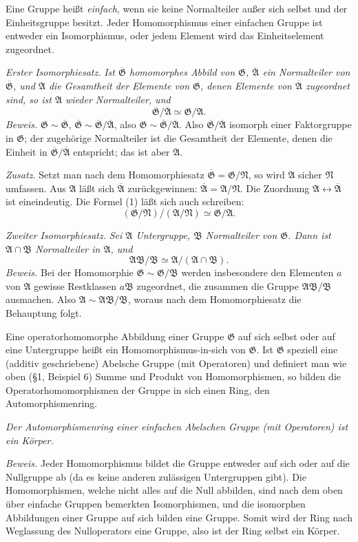 \documentclass[11pt]{article}
\providecommand{\mG}{\mathfrak{G}}
\providecommand{\mA}{\mathfrak{A}}
\providecommand{\mB}{\mathfrak{B}}
\providecommand{\mN}{\mathfrak{N}}
\begin{document}
Eine Gruppe heißt \emph{einfach}, wenn sie keine Normalteiler außer sich selbst und der Einheitsgruppe besitzt. Jeder Homomorphismus einer einfachen Gruppe ist entweder ein Isomorphismus, oder jedem Element wird das Einheitselement zugeordnet.

\emph{Erster Isomorphiesatz.} \emph{Ist $\overline{\mG}$ homomorphes Abbild von $\mG$, $\overline{\mA}$ ein Normalteiler von $\overline{\mG}$, und $\mA$ die Gesamtheit der Elemente von $\mG$, denen Elemente von $\overline{\mA}$ zugeordnet sind, so ist $\mA$ wieder Normalteiler, und}
\[
        \overline{\mG}/\overline{\mA}\simeq \mG/\mA. \tag{1}
\]
\emph{Beweis.} $\mG\sim\overline{\mG}$, $\overline{\mG}\sim\overline{\mG}/\overline{\mA}$, also $\mG\sim\overline{\mG}/\overline{\mA}$. Also $\overline{\mG}/\overline{\mA}$ isomorph einer Faktorgruppe in $\mG$; der zugehörige Normalteiler ist die Gesamtheit der Elemente, denen die Einheit in $\overline{\mG}/\overline{\mA}$ entspricht; das ist aber $\mA$.

\emph{Zusatz.} Setzt man nach dem Homomorphiesatz $\overline{\mG}=\mG/\mN$, so wird $\mA$ sicher $\mN$ umfassen. Aus $\mA$ läßt sich $\overline{\mA}$ zurückgewinnen: $\overline{\mA}=\mA/\mN$. Die Zuordnung $\mA\leftrightarrow\overline{\mA}$ ist eineindeutig. Die Formel (1) läßt sich auch schreiben:
\[
        (\mG/\mN)/(\mA/\mN)\simeq \mG/\mA.
\]

\emph{Zweiter Isomorphiesatz.} \emph{Sei $\mA$ Untergruppe, $\mB$ Normalteiler von $\mG$. Dann ist $\mA\cap\mB$ Normalteiler in $\mA$, und}
\[
        \mA\mB/\mB\simeq \mA/(\mA\cap\mB).
\]
\emph{Beweis.} Bei der Homomorphie $\mG\sim\mG/\mB$ werden insbesondere den Elementen $a$ von $\mA$ gewisse Restklassen $a\mB$ zugeordnet, die zusammen die Gruppe $\mA\mB/\mB$ ausmachen. Also $\mA\sim\mA\mB/\mB$, woraus nach dem Homomorphiesatz die Behauptung folgt.

Eine operatorhomomorphe Abbildung einer Gruppe $\mG$ auf sich selbst oder auf eine Untergruppe heißt ein Homomorphismus-in-sich von $\mG$. Ist $\mG$ speziell eine (additiv geschriebene) Abelsche Gruppe (mit Operatoren) und definiert man wie oben (§1, Beispiel 6) Summe und Produkt von Homomorphismen, so bilden die Operatorhomomorphismen der Gruppe in sich einen Ring, den Automorphismenring.

\emph{Der Automorphismenring einer einfachen Abelschen Gruppe (mit Operatoren) ist ein Körper.}

\emph{Beweis.} Jeder Homomorphismus bildet die Gruppe entweder auf sich oder auf die Nullgruppe ab (da es keine anderen zulässigen Untergruppen gibt). Die Homomorphismen, welche nicht alles auf die Null abbilden, sind nach dem oben über einfache Gruppen bemerkten Isomorphismen, und die isomorphen Abbildungen einer Gruppe auf sich bilden eine Gruppe. Somit wird der Ring nach Weglassung des Nulloperators eine Gruppe, also ist der Ring selbst ein Körper.
\end{document}
